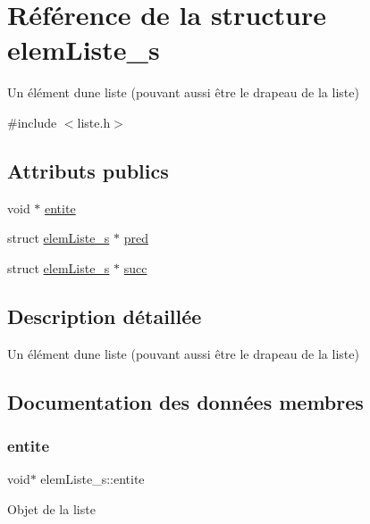 \hypertarget{structelem_liste__s}{}\section{Référence de la structure elem\+Liste\+\_\+s}
\label{structelem_liste__s}


Un élément d\textquotesingle{}une liste (pouvant aussi être le drapeau de la liste)  




{\ttfamily \#include $<$liste.\+h$>$}

\subsection*{Attributs publics}
\begin{DoxyCompactItemize}
\item 
void $\ast$ \hyperlink{structelem_liste__s_a6659e9a46caae782fb612e744bf5c292}{entite}
\item 
struct \hyperlink{structelem_liste__s}{elem\+Liste\+\_\+s} $\ast$ \hyperlink{structelem_liste__s_a46b43e03c0bafb691091e4e4dee1b817}{pred}
\item 
struct \hyperlink{structelem_liste__s}{elem\+Liste\+\_\+s} $\ast$ \hyperlink{structelem_liste__s_aeff23ea23591554c3150bf0df829f7d4}{succ}
\end{DoxyCompactItemize}


\subsection{Description détaillée}
Un élément d\textquotesingle{}une liste (pouvant aussi être le drapeau de la liste) 

\subsection{Documentation des données membres}
\mbox{\label{structelem_liste__s_a6659e9a46caae782fb612e744bf5c292}} 
\subsubsection{\texorpdfstring{entite}{entite}}
{\footnotesize\ttfamily void$\ast$ elem\+Liste\+\_\+s\+::entite}

Objet de la liste \mbox{\label{structelem_liste__s_a46b43e03c0bafb691091e4e4dee1b817}} 
